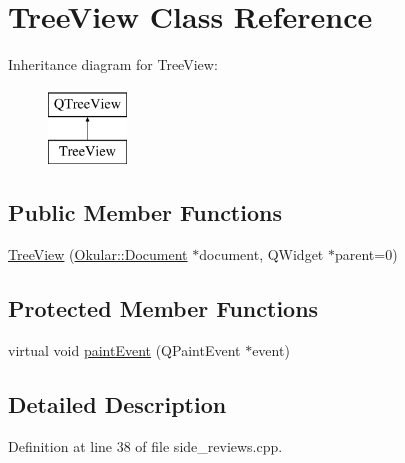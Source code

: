 \hypertarget{classTreeView}{\section{Tree\+View Class Reference}
\label{classTreeView}
}
Inheritance diagram for Tree\+View\+:\begin{figure}[H]
\begin{center}
\leavevmode
\includegraphics[height=2.000000cm]{classTreeView}
\end{center}
\end{figure}
\subsection*{Public Member Functions}
\begin{DoxyCompactItemize}
\item 
\hyperlink{classTreeView_ae4c155eb6768d21a54c34aab58e292ad}{Tree\+View} (\hyperlink{classOkular_1_1Document}{Okular\+::\+Document} $\ast$document, Q\+Widget $\ast$parent=0)
\end{DoxyCompactItemize}
\subsection*{Protected Member Functions}
\begin{DoxyCompactItemize}
\item 
virtual void \hyperlink{classTreeView_ab95914d4f702b774b20c75db051cce93}{paint\+Event} (Q\+Paint\+Event $\ast$event)
\end{DoxyCompactItemize}


\subsection{Detailed Description}


Definition at line 38 of file side\+\_\+reviews.\+cpp.



